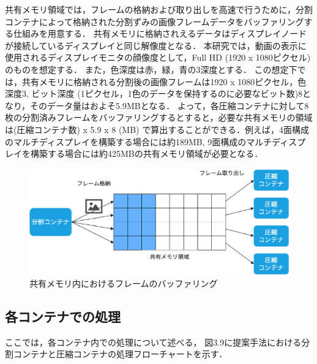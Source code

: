 共有メモリ領域では，フレームの格納および取り出しを高速で行うために，分割コンテナによって格納された分割ずみの画像フレームデータをバッファリングする仕組みを用意する．
共有メモリに格納されえるデータはディスプレイノードが接続しているディスプレイと同じ解像度となる．
本研究では，動画の表示に使用されるディスプレイモニタの顔像度として，Full HD (1920 x 1080ピクセル) のものを想定する．
また，色深度は赤，緑，青の3深度とする．
この想定下では，共有メモリに格納される分割後の画像フレームは1920 x 1080ピクセル，色深度3, ビット深度 (1ピクセル，1色のデータを保持するのに必要なビット数)8となり，そのデータ量はおよそ5.9MBとなる．
よって，各圧縮コンテナに対して8枚の分割済みフレームをバッファリングするとすると，必要な共有メモリの領域は(圧縮コンテナ数) x 5.9 x 8 (MB) で算出することができる．例えば，4面構成のマルチディスプレイを構築する場合には約189MB, 9面構成のマルチディスプレイを構築する場合には約425MBの共有メモリ領域が必要となる．

\begin{figure}[H]
    \hspace*{\fill}
    \includegraphics[width=\linewidth]{./fig/chap3/buffering.eps}
    \hspace*{\fill}
    \caption{共有メモリ内におけるフレームのバッファリング}
\end{figure}

\subsection*{各コンテナでの処理}
ここでは，各コンテナ内での処理について述べる，
図3.9に提案手法における分割コンテナと圧縮コンテナの処理フローチャートを示す．

